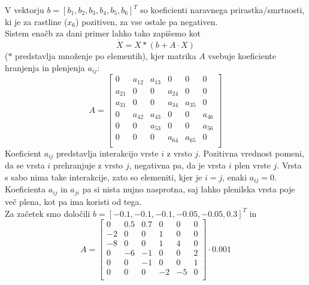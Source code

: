 \documentclass[a4paper, 12pt]{article}
\begin{document}
V vektorju $ b = \left[b_{1}, b_{2}, b_{3}, b_{4}, b_{5}, b_{6}\right]^{T} $ so koeficienti naravnega prirastka/smrtnosti,
ki je za rastline ($ x_{6} $) pozitiven, za vse ostale pa negativen. \\
Sistem enačb za dani primer lahko tako zapišemo kot
\begin{equation}
	\dot X = X*(b+A\cdot X)
\end{equation}
($ * $ predstavlja množenje po elementih),
kjer matrika $ A $ vsebuje koeficiente hranjenja in plenjenja $ a_{ij} $:
\begin{equation}
	A =
	\begin{bmatrix}
		0 & a_{12} & a_{13} & 0 & 0 & 0 \\
		a_{21} & 0 & 0 & a_{24} & 0 & 0 \\
		a_{31} & 0 & 0 & a_{34} & a_{35} & 0 \\
		0 & a_{42} & a_{43} & 0 & 0 & a_{46} \\
		0 & 0 & a_{53} & 0 & 0 & a_{56} \\
		0 & 0 & 0 & a_{64} & a_{65} & 0 \\
	\end{bmatrix}
\end{equation}
Koeficient $ a_{ij} $ predstavlja interakcijo vrste $ i $ z vrsto $ j $. Pozitivna vrednost pomeni, da se vrsta
$ i $ prehranjuje z vrsto $ j $, negativna pa, da je vrsta $ i $ plen vrste $ j $. Vrsta s sabo nima take interakcije, zato
so elemeniti, kjer je $ i=j $, enaki $ a_{ij} = 0 $. Koeficienta $ a_{ij} $ in $ a_{ji} $ pa si nista nujno nasprotna, saj lahko plenilska
vrsta poje več plena, kot pa ima koristi od tega. \\
Za začetek smo določili $ b = \left[-0.1, -0.1, -0.1, -0.05, -0.05, 0.3\right]^{T} $
in 
\begin{equation}
	A = 
	\begin{bmatrix}
		0 & 0.5 & 0.7 & 0 & 0 & 0 \\
		-2 & 0 & 0 & 1 & 0 & 0 \\
		-8 & 0 & 0 & 1 & 4 & 0 \\
		0 & -6 & -1 & 0 & 0 & 2 \\
		0 & 0 & -1 & 0 & 0 & 1 \\
		0 & 0 & 0 & -2 & -5 & 0 \\
	\end{bmatrix}\cdot 0.001
\end{equation}
\end{document}
